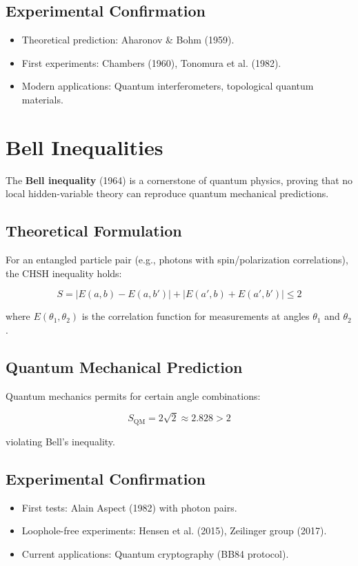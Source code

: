 \subsection{Experimental Confirmation}
\begin{itemize}
\item Theoretical prediction: Aharonov \& Bohm (1959).
\item First experiments: Chambers (1960), Tonomura et al. (1982).
\item Modern applications: Quantum interferometers, topological quantum materials.
\end{itemize}

\section{Bell Inequalities}
\label{sec:bell}

The \textbf{Bell inequality} (1964) is a cornerstone of quantum physics, proving that no local hidden-variable theory can reproduce quantum mechanical predictions.

\subsection{Theoretical Formulation}
For an entangled particle pair (e.g., photons with spin/polarization correlations), the CHSH inequality holds:

\begin{equation}
S = |E(a,b) - E(a,b')| + |E(a',b) + E(a',b')| \leq 2
\end{equation}

where $E(\theta_1, \theta_2)$ is the correlation function for measurements at angles $\theta_1$ and $\theta_2$.

\subsection{Quantum Mechanical Prediction}
Quantum mechanics permits for certain angle combinations:

\begin{equation}
S_{\text{QM}} = 2\sqrt{2} \approx 2.828 > 2
\end{equation}

violating Bell's inequality.

\subsection{Experimental Confirmation}
\begin{itemize}
\item First tests: Alain Aspect (1982) with photon pairs.
\item Loophole-free experiments: Hensen et al. (2015), Zeilinger group (2017).
\item Current applications: Quantum cryptography (BB84 protocol).
\end{itemize}


